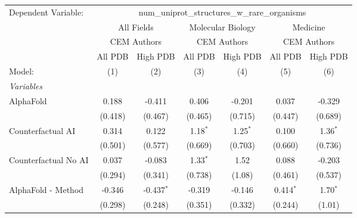 \begingroup
\centering
\begin{tabular}{lcccccc}
   \tabularnewline \midrule \midrule
   Dependent Variable: & \multicolumn{6}{c}{num\_uniprot\_structures\_w\_rare\_organisms}\\
 & \multicolumn{2}{c}{All Fields} & \multicolumn{2}{c}{Molecular Biology} & \multicolumn{2}{c}{Medicine} \\
\cmidrule(lr){2-3} \cmidrule(lr){4-5} \cmidrule(lr){6-7}
 & \multicolumn{2}{c}{CEM Authors} & \multicolumn{2}{c}{CEM Authors} & \multicolumn{2}{c}{CEM Authors} \\
\cmidrule(lr){2-3} \cmidrule(lr){4-5} \cmidrule(lr){6-7}
 & \multicolumn{1}{c}{All PDB} & \multicolumn{1}{c}{High PDB} & \multicolumn{1}{c}{All PDB} & \multicolumn{1}{c}{High PDB} & \multicolumn{1}{c}{All PDB} & \multicolumn{1}{c}{High PDB} \\
\cmidrule(lr){2-2} \cmidrule(lr){3-3} \cmidrule(lr){4-4} \cmidrule(lr){5-5} \cmidrule(lr){6-6} \cmidrule(lr){7-7}
   Model:                                                     & (1)     & (2)          & (3)           & (4)           & (5)           & (6)\\  
   \midrule
   \emph{Variables}\\
   AlphaFold                                                  & 0.188   & -0.411       & 0.406         & -0.201        & 0.037         & -0.329\\   
                                                              & (0.418) & (0.467)      & (0.465)       & (0.715)       & (0.447)       & (0.689)\\   
   Counterfactual AI                                          & 0.314   & 0.122        & 1.18$^{*}$    & 1.25$^{*}$    & 0.100         & 1.36$^{*}$\\   
                                                              & (0.501) & (0.577)      & (0.669)       & (0.703)       & (0.660)       & (0.736)\\   
   Counterfactual No AI                                       & 0.037   & -0.083       & 1.33$^{*}$    & 1.52          & 0.088         & -0.203\\   
                                                              & (0.294) & (0.341)      & (0.738)       & (1.08)        & (0.461)       & (0.537)\\   
   AlphaFold - Method                                         & -0.346  & -0.437$^{*}$ & -0.319        & -0.146        & 0.414$^{*}$   & 1.70$^{*}$\\   
                                                              & (0.298) & (0.248)      & (0.351)       & (0.332)       & (0.244)       & (1.01)\\   

\end{tabular}

